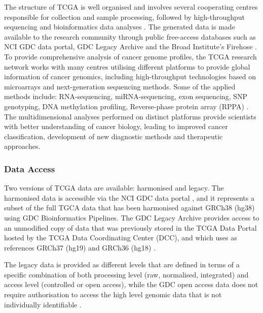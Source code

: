     The structure of TCGA is well organised and involves several cooperating centres responsible for collection and sample processing, followed by high-throughput sequencing and bioinformatics data analyses \cite{Tomczak2015TheKnowledge, OverviewTCGA}. The generated data is made available to the research community through public free-access databases such as NCI GDC data portal, GDC Legacy Archive and the Broad Institute’s Firehose \cite{PapaleoTCGAPackages}. \\To provide comprehensive analysis of cancer genome profiles, the TCGA research network works with many centres utilising different platforms to provide global information of cancer genomics, including high-throughput technologies based on microarrays and next-generation sequencing methods. Some of the applied methods include: RNA-sequencing, miRNA-sequencing, exon sequencing, SNP genotyping, DNA methylation profiling, Reverse-phase protein array (RPPA) \cite{OverviewTCGA}. The multidimensional analyses performed on distinct platforms provide scientists with better understanding of cancer biology, leading to improved cancer classification, development of new diagnostic methods and therapeutic approaches.\\



    \subsubsection{Data Access}

    Two versions of TCGA data are available: harmonised and legacy. The harmonised data is accessible via the NCI GDC data portal \cite{NCICommons}, and it represents a subset of the full TGCA data that has been harmonised against GRCh38 (hg38) using GDC Bioinformatics Pipelines. The GDC Legacy Archive provides access to an unmodified copy of data that was previously stored in the TCGA Data Portal hosted by the TCGA Data Coordinating Center (DCC), and  which uses as references GRCh37 (hg19) and GRCh36 (hg18) \cite{PapaleoTCGAPackages}.

    The legacy data is provided as different levels that are defined in terms of a specific combination of both processing level (raw, normalised, integrated) and access level (controlled or open access), while the GDC open access data does not require authorisation to access the high level genomic data that is not individually identifiable \cite{NCICommons, PapaleoTCGAPackages}.
    
